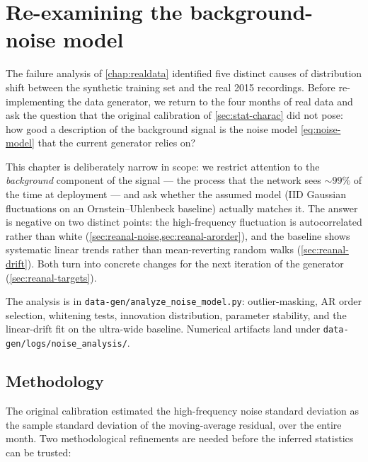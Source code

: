 \chapter{Re-examining the background-noise model}
\label{chap:reanalysis}

The failure analysis of \cref{chap:realdata} identified five distinct
causes of distribution shift between the synthetic training set and
the real 2015 recordings. Before re-implementing the data generator,
we return to the four months of real data and ask the question that
the original calibration of \cref{sec:stat-charac} did not pose: how
good a description of the background signal is the noise model
\cref{eq:noise-model} that the current generator relies on?

This chapter is deliberately narrow in scope: we restrict attention to
the \emph{background} component of the signal --- the process that the
network sees $\sim 99\%$ of the time at deployment --- and ask whether
the assumed model (IID Gaussian fluctuations on an Ornstein--Uhlenbeck
baseline) actually matches it. The answer is negative on two distinct
points: the high-frequency fluctuation is autocorrelated rather than
white (\cref{sec:reanal-noise,sec:reanal-arorder}), and the baseline
shows systematic linear trends rather than mean-reverting random
walks (\cref{sec:reanal-drift}). Both turn into concrete changes for
the next iteration of the generator (\cref{sec:reanal-targets}).

The analysis is in
\texttt{data-gen/analyze\_noise\_model.py}: outlier-masking, AR order
selection, whitening tests, innovation distribution, parameter
stability, and the linear-drift fit on the ultra-wide baseline.
Numerical artifacts land under
\texttt{data-gen/logs/noise\_analysis/}.

\section{Methodology}
\label{sec:reanal-method}

The original calibration estimated the high-frequency noise standard
deviation as the sample standard deviation of the moving-average
residual, over the entire month. Two methodological refinements are
needed before the inferred statistics can be trusted:

